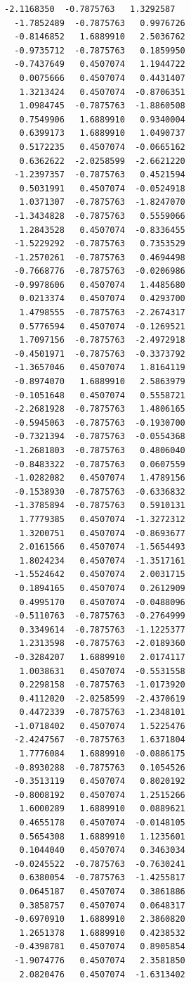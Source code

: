 \documentclass[11pt]{article}
\begin{document}
\begin{Verbatim}[commandchars=\\\{\}]
  -2.1168350  -0.7875763   1.3292587
  -1.7852489  -0.7875763   0.9976726
  -0.8146852   1.6889910   2.5036762
  -0.9735712  -0.7875763   0.1859950
  -0.7437649   0.4507074   1.1944722
   0.0075666   0.4507074   0.4431407
   1.3213424   0.4507074  -0.8706351
   1.0984745  -0.7875763  -1.8860508
   0.7549906   1.6889910   0.9340004
   0.6399173   1.6889910   1.0490737
   0.5172235   0.4507074  -0.0665162
   0.6362622  -2.0258599  -2.6621220
  -1.2397357  -0.7875763   0.4521594
   0.5031991   0.4507074  -0.0524918
   1.0371307  -0.7875763  -1.8247070
  -1.3434828  -0.7875763   0.5559066
   1.2843528   0.4507074  -0.8336455
  -1.5229292  -0.7875763   0.7353529
  -1.2570261  -0.7875763   0.4694498
  -0.7668776  -0.7875763  -0.0206986
  -0.9978606   0.4507074   1.4485680
   0.0213374   0.4507074   0.4293700
   1.4798555  -0.7875763  -2.2674317
   0.5776594   0.4507074  -0.1269521
   1.7097156  -0.7875763  -2.4972918
  -0.4501971  -0.7875763  -0.3373792
  -1.3657046   0.4507074   1.8164119
  -0.8974070   1.6889910   2.5863979
  -0.1051648   0.4507074   0.5558721
  -2.2681928  -0.7875763   1.4806165
  -0.5945063  -0.7875763  -0.1930700
  -0.7321394  -0.7875763  -0.0554368
  -1.2681803  -0.7875763   0.4806040
  -0.8483322  -0.7875763   0.0607559
  -1.0282082   0.4507074   1.4789156
  -0.1538930  -0.7875763  -0.6336832
  -1.3785894  -0.7875763   0.5910131
   1.7779385   0.4507074  -1.3272312
   1.3200751   0.4507074  -0.8693677
   2.0161566   0.4507074  -1.5654493
   1.8024234   0.4507074  -1.3517161
  -1.5524642   0.4507074   2.0031715
   0.1894165   0.4507074   0.2612909
   0.4995170   0.4507074  -0.0488096
  -0.5110763  -0.7875763  -0.2764999
   0.3349614  -0.7875763  -1.1225377
   1.2313598  -0.7875763  -2.0189360
  -0.3284207   1.6889910   2.0174117
   1.0038631   0.4507074  -0.5531558
   0.2298158  -0.7875763  -1.0173920
   0.4112020  -2.0258599  -2.4370619
   0.4472339  -0.7875763  -1.2348101
  -1.0718402   0.4507074   1.5225476
  -2.4247567  -0.7875763   1.6371804
   1.7776084   1.6889910  -0.0886175
  -0.8930288  -0.7875763   0.1054526
  -0.3513119   0.4507074   0.8020192
  -0.8008192   0.4507074   1.2515266
   1.6000289   1.6889910   0.0889621
   0.4655178   0.4507074  -0.0148105
   0.5654308   1.6889910   1.1235601
   0.1044040   0.4507074   0.3463034
  -0.0245522  -0.7875763  -0.7630241
   0.6380054  -0.7875763  -1.4255817
   0.0645187   0.4507074   0.3861886
   0.3858757   0.4507074   0.0648317
  -0.6970910   1.6889910   2.3860820
   1.2651378   1.6889910   0.4238532
  -0.4398781   0.4507074   0.8905854
  -1.9074776   0.4507074   2.3581850
   2.0820476   0.4507074  -1.6313402

\end{Verbatim}
\end{document}
